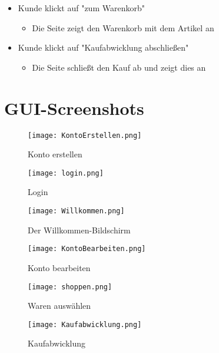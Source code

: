 \documentclass[a4paper]{article}
\begin{document}
\begin{description}
\begin{itemize}
\begin{itemize}
		\end{itemize}
		\item Kunde klickt auf "zum Warenkorb"
		\begin{itemize}
			\item Die Seite zeigt den Warenkorb mit dem Artikel an
		\end{itemize}
		\item Kunde klickt auf "Kaufabwicklung abschließen"
		\begin{itemize}
			\item Die Seite schließt den Kauf ab und zeigt dies an
		\end{itemize}
	\end{itemize}
\end{description}

\section{GUI-Screenshots}
\begin{figure}[!ht]
\centering
\texttt{[image: KontoErstellen.png]}
\caption{Konto erstellen}
\end{figure}
\begin{figure}[!ht]
\centering
\texttt{[image: login.png]}
\caption{Login}
\end{figure}
\begin{figure}[!ht]
\centering
\texttt{[image: Willkommen.png]}
\caption{Der Willkommen-Bildschirm}
\end{figure}
\begin{figure}[!ht]
\centering
\texttt{[image: KontoBearbeiten.png]}
\caption{Konto bearbeiten}
\end{figure}
\begin{figure}[!ht]
\centering
\texttt{[image: shoppen.png]}
\caption{Waren auswählen}
\end{figure}
\begin{figure}[!ht]
\centering
\texttt{[image: Kaufabwicklung.png]}
\caption{Kaufabwicklung}
\end{figure}

	
\end{document}
